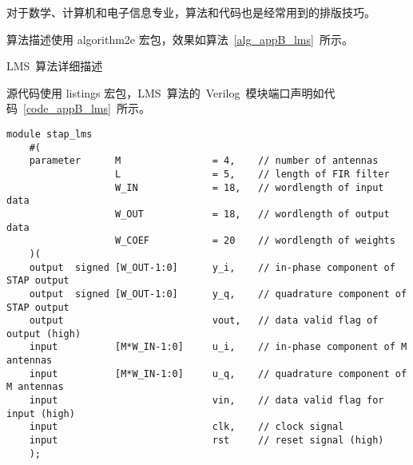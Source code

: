 

对于数学、计算机和电子信息专业，算法和代码也是经常用到的排版技巧。


算法描述使用 algorithm2e 宏包，效果如算法~\ref{alg_appB_lms}~所示。

\begin{algorithm}[ht]
	\caption{LMS~算法详细描述 \label{alg_appB_lms}}
	\IncMargin{2em}
	\DontPrintSemicolon
\end{algorithm}



源代码使用 listings 宏包，LMS~算法的~Verilog~模块端口声明如代码~\ref{code_appB_lms}~所示。

{\fontsize{10pt}{0.5\baselineskip}\selectfont
	\begin{lstlisting}[caption={空时~LMS~算法~Verilog~模块端口声明},label={code_appB_lms}]
	module stap_lms
	#(
	parameter      M                = 4,    // number of antennas
	               L                = 5,    // length of FIR filter
	               W_IN             = 18,   // wordlength of input data
	               W_OUT            = 18,   // wordlength of output data
	               W_COEF           = 20    // wordlength of weights
	)(
	output  signed [W_OUT-1:0]      y_i,    // in-phase component of STAP output
	output  signed [W_OUT-1:0]      y_q,    // quadrature component of STAP output
	output                          vout,   // data valid flag of output (high)
	input          [M*W_IN-1:0]     u_i,    // in-phase component of M antennas
	input          [M*W_IN-1:0]     u_q,    // quadrature component of M antennas
	input                           vin,    // data valid flag for input (high)
	input                           clk,    // clock signal
	input                           rst     // reset signal (high)
	);
	\end{lstlisting}
}

\clearpage{\pagestyle{empty}\cleardoublepage}
